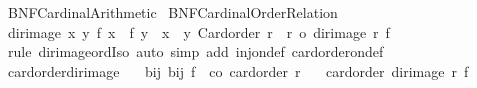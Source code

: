 %
\begin{isabellebody}%
%
%
\isadelimdocument
%
\endisadelimdocument
%
\isatagdocument
%
\isamarkuptrue%
%
\endisatagdocument
{\isafolddocument}%
%
\isadelimdocument
%
\endisadelimdocument
%
\isadelimtheory
%
\endisadelimtheory
%
\isatagtheory
{}\isamarkupfalse%
\ BNF{\isacharunderscore}{\kern0pt}Cardinal{\isacharunderscore}{\kern0pt}Arithmetic\isanewline
{}\ BNF{\isacharunderscore}{\kern0pt}Cardinal{\isacharunderscore}{\kern0pt}Order{\isacharunderscore}{\kern0pt}Relation\isanewline
{}%
\endisatagtheory
{\isafoldtheory}%
%
\isadelimtheory
\isanewline
%
\endisadelimtheory
\isanewline
{}\isamarkupfalse%
\ dir{\isacharunderscore}{\kern0pt}image{\isacharcolon}{\kern0pt}\ {\isachardoublequoteopen}{\isasymlbrakk}{\isasymAnd}x\ y{\isachardot}{\kern0pt}\ {\isacharparenleft}{\kern0pt}f\ x\ {\isacharequal}{\kern0pt}\ f\ y{\isacharparenright}{\kern0pt}\ {\isacharequal}{\kern0pt}\ {\isacharparenleft}{\kern0pt}x\ {\isacharequal}{\kern0pt}\ y{\isacharparenright}{\kern0pt}{\isacharsemicolon}{\kern0pt}\ Card{\isacharunderscore}{\kern0pt}order\ r{\isasymrbrakk}\ {\isasymLongrightarrow}\ r\ {\isacharequal}{\kern0pt}o\ dir{\isacharunderscore}{\kern0pt}image\ r\ f{\isachardoublequoteclose}\isanewline
%
\isadelimproof
%
\endisadelimproof
%
\isatagproof
{}\isamarkupfalse%
\ {\isacharparenleft}{\kern0pt}rule\ dir{\isacharunderscore}{\kern0pt}image{\isacharunderscore}{\kern0pt}ordIso{\isacharparenright}{\kern0pt}\ {\isacharparenleft}{\kern0pt}auto\ simp\ add{\isacharcolon}{\kern0pt}\ inj{\isacharunderscore}{\kern0pt}on{\isacharunderscore}{\kern0pt}def\ card{\isacharunderscore}{\kern0pt}order{\isacharunderscore}{\kern0pt}on{\isacharunderscore}{\kern0pt}def{\isacharparenright}{\kern0pt}%
\endisatagproof
{\isafoldproof}%
%
\isadelimproof
\isanewline
%
\endisadelimproof
\isanewline
{}\isamarkupfalse%
\ card{\isacharunderscore}{\kern0pt}order{\isacharunderscore}{\kern0pt}dir{\isacharunderscore}{\kern0pt}image{\isacharcolon}{\kern0pt}\isanewline
\ \ \ bij{\isacharcolon}{\kern0pt}\ {\isachardoublequoteopen}bij\ f{\isachardoublequoteclose}\ \ co{\isacharcolon}{\kern0pt}\ {\isachardoublequoteopen}card{\isacharunderscore}{\kern0pt}order\ r{\isachardoublequoteclose}\isanewline
\ \ \ {\isachardoublequoteopen}card{\isacharunderscore}{\kern0pt}order\ {\isacharparenleft}{\kern0pt}dir{\isacharunderscore}{\kern0pt}image\ r\ f{\isacharparenright}{\kern0pt}{\isachardoublequoteclose}\isanewline

\end{isabellebody}
